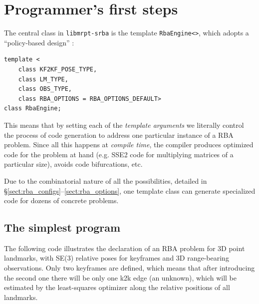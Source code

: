 \documentclass[a4paper,11pt]{article}
\begin{document}
\newpage


\section{Programmer's first steps}
\label{sect:program_first}

The central class in \texttt{libmrpt-srba} is the template \texttt{RbaEngine<>}, which 
adopts a ``policy-based design'' \cite{andrei2001modern}:

\begin{lstlisting}
template <
	class KF2KF_POSE_TYPE,
	class LM_TYPE,
	class OBS_TYPE, 
	class RBA_OPTIONS = RBA_OPTIONS_DEFAULT>
class RbaEngine;
\end{lstlisting}

This means that by setting each of the \emph{template arguments} we literally control the process 
of code generation to address one particular instance of a RBA problem. 
Since all this happens at \emph{compile time}, the compiler produces optimized code for 
the problem at hand (e.g. SSE2 code for multiplying matrices of a particular size), 
avoids code bifurcations, etc.

Due to the combinatorial nature of all the possibilities, 
detailed in \S\ref{sect:rba_configs}--\ref{sect:rba_options}, one template class 
can generate specialized code for dozens of concrete problems.


\subsection{The simplest program}

The following code illustrates the declaration of an RBA problem for 3D point landmarks, 
with SE(3) relative poses for keyframes and 3D range-bearing observations. 
Only two keyframes are defined, which means that after introducing the second one
there will be only one k2k edge (an unknown), which will be estimated by the least-squares 
optimizer along the relative positions of all landmarks.
\end{document}
